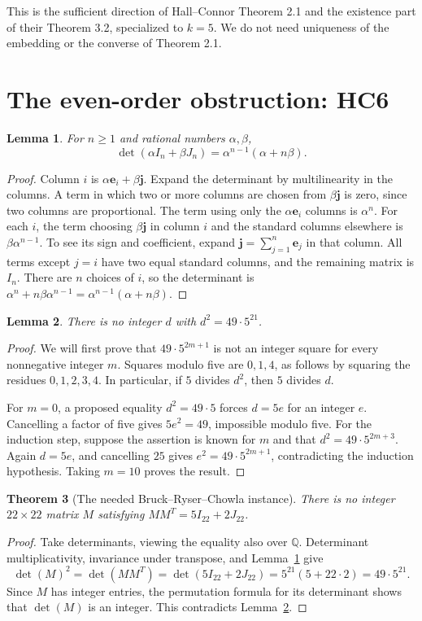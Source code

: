 \documentclass[11pt]{article}
\newcommand\rats{{\mathbb Q}}
\newcommand\Zj{{\mathbf j}}
\newtheorem{theorem}{Theorem}[section]
\newtheorem{lemma}[theorem]{Lemma}
\theoremstyle{definition}
\newcommand{\Ze}{{\mathbf e}}
\begin{document}
This is the sufficient direction of Hall--Connor Theorem 2.1 and the
existence part of their Theorem 3.2, specialized to $k=5$. We do not
need uniqueness of the embedding or the converse of Theorem 2.1.

\section{The even-order obstruction: HC6}\label{sec:BRC}

\begin{lemma}\label{lem:det-rank-one}
For $n\ge1$ and rational numbers $\alpha,\beta$,
\[
 \det(\alpha I_n+\beta J_n)=\alpha^{n-1}(\alpha+n\beta).
\]
\end{lemma}
\begin{proof}
Column $i$ is $\alpha\Ze_i+\beta\Zj$. Expand the determinant by multilinearity
in the columns. A term in which two or more columns are chosen from
$\beta\Zj$ is zero, since two columns are proportional. The term using
only the $\alpha\Ze_i$ columns is $\alpha^n$. For each $i$, the term choosing
$\beta\Zj$ in column $i$ and the standard columns elsewhere is
$\beta\alpha^{n-1}$. To see its sign and coefficient, expand
$\Zj=\sum_{j=1}^n\Ze_j$ in that column. All terms except $j=i$ have
two equal standard columns, and the remaining matrix is $I_n$.
There are $n$ choices of $i$, so the determinant is
$\alpha^n+n\beta\alpha^{n-1}=\alpha^{n-1}(\alpha+n\beta)$.
\end{proof}

\begin{lemma}\label{lem:odd-power}
There is no integer $d$ with $d^2=49\cdot5^{21}$.
\end{lemma}
\begin{proof}
We will first prove that $49\cdot5^{2m+1}$ is not an integer square
for every nonnegative integer $m$. Squares modulo five are $0,1,4$,
as follows by squaring the residues $0,1,2,3,4$. In particular, if
$5$ divides $d^2$, then $5$ divides $d$.

For $m=0$, a proposed equality $d^2=49\cdot5$ forces $d=5e$ for an
integer $e$. Cancelling a factor of five gives $5e^2=49$, impossible
modulo five. For the induction step, suppose the assertion is known
for $m$ and that $d^2=49\cdot5^{2m+3}$. Again $d=5e$, and cancelling
$25$ gives $e^2=49\cdot5^{2m+1}$, contradicting the induction
hypothesis. Taking $m=10$ proves the result.
\end{proof}

\begin{theorem}[The needed Bruck--Ryser--Chowla instance]
\label{thm:BRC}
There is no integer $22\times22$ matrix $M$ satisfying
$MM^T=5I_{22}+2J_{22}$.
\end{theorem}
\begin{proof}
Take determinants, viewing the equality also over $\rats$. Determinant
multiplicativity, invariance under transpose, and
Lemma~\ref{lem:det-rank-one} give
\[
 \det(M)^2=\det(MM^T)=\det(5I_{22}+2J_{22})
   =5^{21}(5+22\cdot2)=49\cdot5^{21}.
\]
Since $M$ has integer entries, the permutation formula for its
determinant shows that $\det(M)$ is an integer. This contradicts
Lemma~\ref{lem:odd-power}.
\end{proof}
\end{document}
